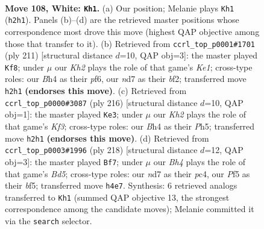\documentclass[11pt]{article}
\begin{document}
\clearpage

\begin{figure}[p]\centering
\begin{subfigure}{0.46\textwidth}\centering
\resizebox{\linewidth}{!}{%
\newchessgame
\chessboard[
  setfen={6k1/3n4/8/5P2/p6B/P6P/7K/8 w - - 35 108},
  showmover=false,
  pgfstyle=straightmove, color=movearrow, markmove={h2-h1}
]}
\caption{}
\end{subfigure}\hfill
\begin{subfigure}{0.46\textwidth}\centering
\resizebox{\linewidth}{!}{%
\newchessgame
\chessboard[
  setfen={4k3/2K2p1p/5P1P/8/8/5p2/5B2/8 b - - 41 106},
  showmover=false,
  pgfstyle=straightmove, color=movearrow, markmove={e8-f8}
]}
\caption{}
\end{subfigure}
\\[4pt]
\begin{subfigure}{0.46\textwidth}\centering
\resizebox{\linewidth}{!}{%
\newchessgame
\chessboard[
  setfen={8/6k1/3p4/p6P/2P4P/5K2/8/8 w - - 0 109},
  showmover=false,
  pgfstyle=straightmove, color=movearrow, markmove={f3-e3}
]}
\caption{}
\end{subfigure}\hfill
\begin{subfigure}{0.46\textwidth}\centering
\resizebox{\linewidth}{!}{%
\newchessgame
\chessboard[
  setfen={8/2k5/8/1p1B1b2/1PpP4/4K3/8/8 w - - 1 110},
  showmover=false,
  pgfstyle=straightmove, color=movearrow, markmove={d5-f7}
]}
\caption{}
\end{subfigure}
\caption{\textbf{Move 108, White: \texttt{Kh1}.} (a) Our position; Melanie plays \texttt{Kh1} (\texttt{h2h1}). Panels (b)--(d) are the retrieved master positions whose correspondence most drove this move (highest QAP objective among those that transfer to it). (b) Retrieved from \texttt{ccrl\_top\_p0001\#1701} (ply 211) [structural distance $d$=10, QAP obj=3]: the master played \texttt{Kf8}; under $\mu$ our \emph{Kh2} plays the role of that game's \emph{Ke1}; cross-type roles: our \emph{B}h4 as their \emph{p}f6, our \emph{n}d7 as their \emph{b}f2; transferred move \texttt{h2h1} \textbf{(endorses this move)}. (c) Retrieved from \texttt{ccrl\_top\_p0000\#3087} (ply 216) [structural distance $d$=10, QAP obj=1]: the master played \texttt{Ke3}; under $\mu$ our \emph{Kh2} plays the role of that game's \emph{Kf3}; cross-type roles: our \emph{B}h4 as their \emph{P}h5; transferred move \texttt{h2h1} \textbf{(endorses this move)}. (d) Retrieved from \texttt{ccrl\_top\_p0003\#1996} (ply 218) [structural distance $d$=12, QAP obj=3]: the master played \texttt{Bf7}; under $\mu$ our \emph{Bh4} plays the role of that game's \emph{Bd5}; cross-type roles: our \emph{n}d7 as their \emph{p}c4, our \emph{P}f5 as their \emph{b}f5; transferred move \texttt{h4e7}. Synthesis: 6 retrieved analogs transferred to \texttt{Kh1} (summed QAP objective 13, the strongest correspondence among the candidate moves); Melanie committed it via the \texttt{search} selector.}
\label{fig:thought-m214}
\end{figure}
\end{document}
